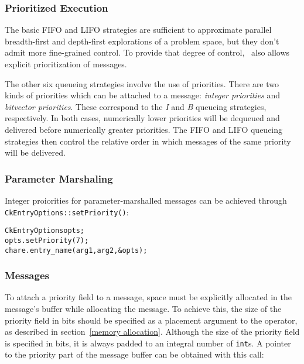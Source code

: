 \subsubsection{Prioritized Execution}
\label{prioritized message passing}

The basic FIFO and LIFO strategies are sufficient to approximate
parallel breadth-first and depth-first explorations of a problem
space, but they don't admit more fine-grained control. To provide that
degree of control, \charmpp\ also allows explicit prioritization of
messages.

The other six queueing strategies involve the use of
priorities.  There are two kinds of priorities which can be
attached to a message: \emph{integer priorities} and
\emph{bitvector priorities}. These correspond to
the \emph{I} and \emph{B} queueing strategies, respectively. In both cases,
numerically lower priorities will be dequeued and delivered before numerically
greater priorities. The FIFO and LIFO queueing strategies then control the
relative order in which messages of the same priority will be delivered.

\subsubsection{Parameter Marshaling}

Integer proiorities for parameter-marshalled messages can be achieved
through {\tt CkEntryOptions::setPriority()}:

\begin{alltt}
  CkEntryOptions opts;
  opts.setPriority(7);
  chare.entry_name(arg1, arg2, &opts);
\end{alltt}

\subsubsection{Messages}

To attach a priority field to a message, space must be explicitly allocated in
the message's buffer while allocating the message.  To
achieve this, the size of the priority field in bits
should be specified as a placement argument to the  operator, as
described in section~\ref{memory allocation}.  Although the size of the
priority field is specified in bits, it is always padded to an integral number
of {\tt int}s.  A pointer to the priority part of the message buffer can be
obtained with this call:\\

